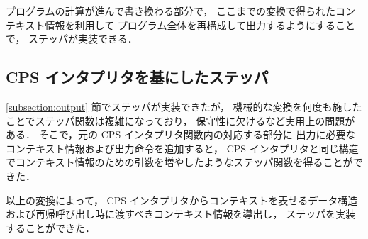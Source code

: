 プログラムの計算が進んで書き換わる部分で，
ここまでの変換で得られたコンテキスト情報を利用して
プログラム全体を再構成して出力するようにすることで，
ステッパが実装できる．

\subsection{CPS インタプリタを基にしたステッパ}
\label{subsection:stepper}

\ref{subsection:output} 節でステッパが実装できたが，
機械的な変換を何度も施したことでステッパ関数は複雑になっており，
保守性に欠けるなど実用上の問題がある．
そこで，元の CPS インタプリタ関数内の対応する部分に
出力に必要なコンテキスト情報および出力命令を追加すると，
CPS インタプリタと同じ構造でコンテキスト情報のための引数を増やしたようなステッパ関数を得ることができた．

以上の変換によって，
CPS インタプリタからコンテキストを表せるデータ構造および再帰呼び出し時に渡すべきコンテキスト情報を導出し，
ステッパを実装することができた．
